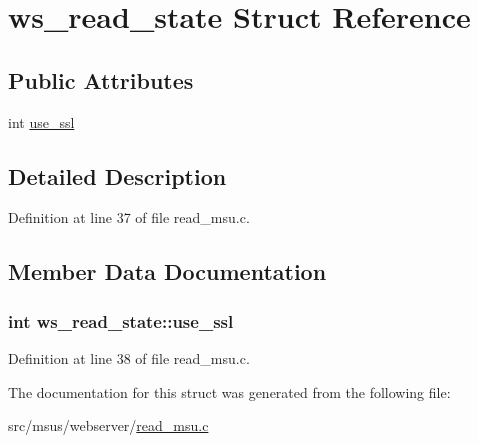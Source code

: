 \hypertarget{structws__read__state}{\section{ws\-\_\-read\-\_\-state Struct Reference}
\label{structws__read__state}
}
\subsection*{Public Attributes}
\begin{DoxyCompactItemize}
\item 
int \hyperlink{structws__read__state_a7205cee380e1d033b8b56aa01bfbad81}{use\-\_\-ssl}
\end{DoxyCompactItemize}


\subsection{Detailed Description}


Definition at line 37 of file read\-\_\-msu.\-c.



\subsection{Member Data Documentation}
\hypertarget{structws__read__state_a7205cee380e1d033b8b56aa01bfbad81}{
\subsubsection[{use\-\_\-ssl}]{\setlength{\rightskip}{0pt plus 5cm}int ws\-\_\-read\-\_\-state\-::use\-\_\-ssl}}\label{structws__read__state_a7205cee380e1d033b8b56aa01bfbad81}


Definition at line 38 of file read\-\_\-msu.\-c.



The documentation for this struct was generated from the following file\-:\begin{DoxyCompactItemize}
\item 
src/msus/webserver/\hyperlink{read__msu_8c}{read\-\_\-msu.\-c}\end{DoxyCompactItemize}
